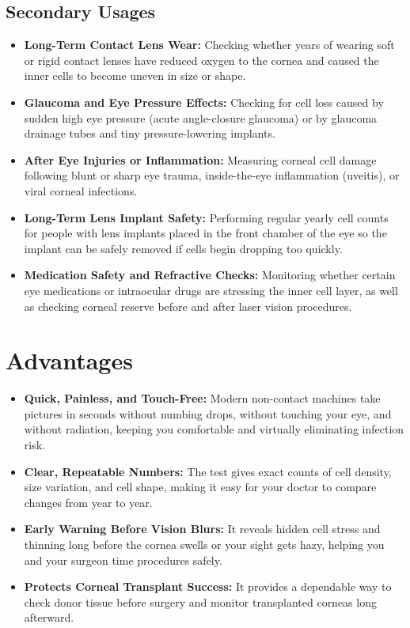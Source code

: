 \subsection{Secondary Usages}

\begin{itemize}
    \item \textbf{Long-Term Contact Lens Wear:} Checking whether years of wearing soft or rigid contact lenses have reduced oxygen to the cornea and caused the inner cells to become uneven in size or shape.
    \item \textbf{Glaucoma and Eye Pressure Effects:} Checking for cell loss caused by sudden high eye pressure (acute angle-closure glaucoma) or by glaucoma drainage tubes and tiny pressure-lowering implants.
    \item \textbf{After Eye Injuries or Inflammation:} Measuring corneal cell damage following blunt or sharp eye trauma, inside-the-eye inflammation (uveitis), or viral corneal infections.
    \item \textbf{Long-Term Lens Implant Safety:} Performing regular yearly cell counts for people with lens implants placed in the front chamber of the eye so the implant can be safely removed if cells begin dropping too quickly.
    \item \textbf{Medication Safety and Refractive Checks:} Monitoring whether certain eye medications or intraocular drugs are stressing the inner cell layer, as well as checking corneal reserve before and after laser vision procedures.
\end{itemize}

\section{Advantages}

\begin{itemize}
    \item \textbf{Quick, Painless, and Touch-Free:} Modern non-contact machines take pictures in seconds without numbing drops, without touching your eye, and without radiation, keeping you comfortable and virtually eliminating infection risk.
    \item \textbf{Clear, Repeatable Numbers:} The test gives exact counts of cell density, size variation, and cell shape, making it easy for your doctor to compare changes from year to year.
    \item \textbf{Early Warning Before Vision Blurs:} It reveals hidden cell stress and thinning long before the cornea swells or your sight gets hazy, helping you and your surgeon time procedures safely.
    \item \textbf{Protects Corneal Transplant Success:} It provides a dependable way to check donor tissue before surgery and monitor transplanted corneas long afterward.
\end{itemize}

